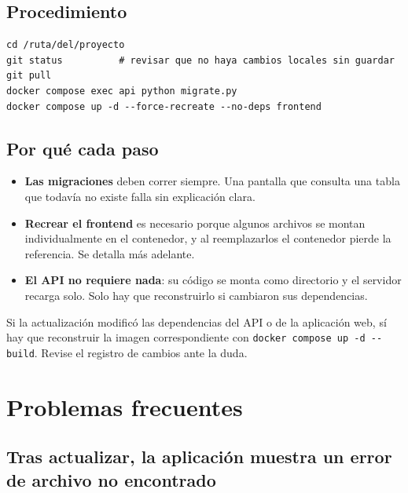 \subsection{Procedimiento}

\begin{verbatim}
cd /ruta/del/proyecto
git status          # revisar que no haya cambios locales sin guardar
git pull
docker compose exec api python migrate.py
docker compose up -d --force-recreate --no-deps frontend
\end{verbatim}

\subsection{Por qué cada paso}

\begin{itemize}[leftmargin=*, itemsep=4pt]
  \item \textbf{Las migraciones} deben correr siempre. Una pantalla que consulta
        una tabla que todavía no existe falla sin explicación clara.
  \item \textbf{Recrear el frontend} es necesario porque algunos archivos se
        montan individualmente en el contenedor, y al reemplazarlos el
        contenedor pierde la referencia. Se detalla más adelante.
  \item \textbf{El API no requiere nada}: su código se monta como directorio y
        el servidor recarga solo. Solo hay que reconstruirlo si cambiaron sus
        dependencias.
\end{itemize}

\begin{aviso}
Si la actualización modificó las dependencias del API o de la aplicación web, sí
hay que reconstruir la imagen correspondiente con
\texttt{docker compose up -d -{}-build}. Revise el registro de cambios ante la
duda.
\end{aviso}

\newpage
\section{Problemas frecuentes}

\subsection*{Tras actualizar, la aplicación muestra un error de archivo no encontrado}


